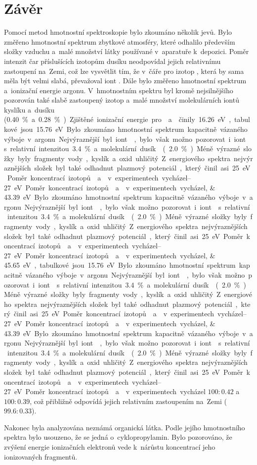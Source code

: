 \documentclass{protokol}
\begin{document}
\section{Závěr}
Pomocí metod hmotnostní spektroskopie bylo zkoumáno několik jevů.
Bylo změřeno hmotnostní spektrum zbytkové atmosféry, které odhalilo
především složky vzduchu a~malé množství látky používané v~aparatuře
k~depozici.
Poměr intenzit čar příslušících izotopům dusíku neodpovídal jejich
relativnímu zastoupení na~Zemi, což lze vysvětlit tím, že v~čáře
pro izotop , která by sama měla být velmi slabá,
převažoval iont .
Dále bylo změřeno hmotnostní spektrum a~ionizační energie argonu.
V~hmotnostním spektru byl kromě nejsilnějšího 
pozorován také slabě zastoupený izotop 
a~malé množství molekulárních iontů kyslíku a~dusíku
(\SI{0.40}\percent a~\SI{0.28}\percent).
Zjištěné ionizační energie pro  a~ činily
\SIlist{16.26;45.65}\electronvolt,
tabulkové jsou \SIlist{15.76;43.39}\electronvolt.

Bylo zkoumáno hmotnostní spektrum kapacitně vázaného výboje v~argonu.
Nejvýraznější byl iont , bylo však možno pozorovat
i~iont  s~relativní intenzitou \SI{3.4}\percent
a~molekulární dusík  (\SI{2.0}\percent).
Méně výrazné složky byly fragmenty vody, kyslík a~oxid uhličitý.
Z~energiového spektra nejvýraznějších složek byl také odhadnut
plazmový potenciál, který činil asi \SIrange{25}{27}\electronvolt.
Poměr koncentrací izotopů  a~ v~experimentech
vycházel $100:\num{0.42}$ a~$100:\num{0.39}$, což přibližně odpovídá jejich
relativním zastoupením na~Zemi ($\num{99.6}:\num{0.33}$).

Nakonec byla analyzována neznámá organická látka.
Podle jejího hmotnostního spektra bylo usouzeno, že se jedná
o~cyklopropylamin.
Bylo pozorováno, že zvýšení energie ionizačních elektronů vede
k~nárůstu koncentrací jeho ionizovaných fragmentů.

\printbibliography[title={Seznam použité literatury}]
\end{document}

